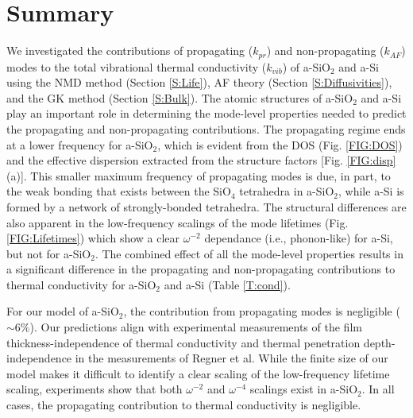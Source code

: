 \documentclass[aps,prb,onecolumn,preprint,superscriptaddress,footinbib,amsmath,amssymb,floatfix]{revtex4}
\begin{document}

\clearpage

\section{\label{S:Lifetimes}Summary}

We investigated the contributions of propagating ($k_{pr}$) 
and non-propagating ($k_{AF}$) modes to the total vibrational 
thermal conductivity ($k_{vib}$) of 
a-SiO$_2$ and a-Si using the NMD method (Section \ref{S:Life}),  
AF theory (Section \ref{S:Diffusivities}), and 
the GK method (Section \ref{S:Bulk}). 
The atomic structures of a-SiO$_2$ and a-Si play an important role 
in determining the mode-level properties needed to predict the 
propagating and non-propagating contributions. The 
propagating regime ends at a lower frequency for a-SiO$_2$, which is 
evident from the DOS (Fig. \ref{FIG:DOS}) 
and the effective dispersion extracted from the structure factors 
[Fig. \ref{FIG:disp}(a)]. This smaller maximum frequency of 
propagating modes is due, in part, 
to the weak bonding that exists between the SiO$_4$ 
tetrahedra in a-SiO$_2$,
\cite{van_Beest_force_1990,kramer_interatomic_1991,
guissani_numerical_1996,mcgaughey_thermal_2004} 
while a-Si is formed by a network 
of strongly-bonded tetrahedra.
\cite{stillinger_computer_1985,biswas_vibrational_1988,
allen_diffusons_1999,barkema_high-quality_2000} 
The structural differences are also 
apparent in the low-frequency scalings of the mode lifetimes (Fig. 
\ref{FIG:Lifetimes}) which show a clear $\omega^{-2}$ dependance 
(i.e., phonon-like) 
for a-Si, but not for a-SiO$_2$. The combined effect of all the 
mode-level properties results in a significant difference 
in the propagating and non-propagating contributions 
to thermal conductivity for a-SiO$_2$ and a-Si (Table \ref{T:cond}). 

For our model of a-SiO$_2$, the contribution from propagating modes 
is negligible ($\sim$6$\%$). 
Our predictions align with experimental measurements of the film 
thickness-independence of thermal conductivity 
\cite{lee_heat_1997,yamane_measurement_2002} 
and thermal penetration depth-independence in the measurements  
of Regner et al.\cite{regner_broadband_2013}
While the finite size 
of our model makes it difficult to identify a clear scaling 
of the low-frequency lifetime scaling, experiments show that 
both $\omega^{-2}$ and $\omega^{-4}$ scalings exist in 
a-SiO$_2$.\cite{masciovecchio_evidence_2006,baldi_sound_2010,
baldi_emergence_2013} In all cases, the propagating contribution to 
thermal conductivity is negligible.\cite{love_estimate_1990,
lee_heat_1997,yamane_measurement_2002,baldi_thermal_2008}
\end{document}
